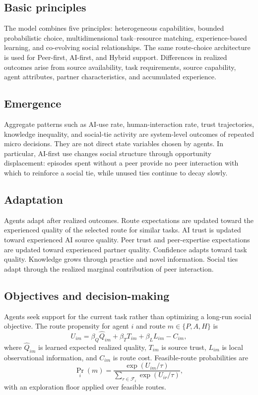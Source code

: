 \documentclass[11pt]{article}
\begin{document}
\subsection{Basic principles}
The model combines five principles: heterogeneous capabilities, bounded probabilistic choice, multidimensional task--resource matching, experience-based learning, and co-evolving social relationships. The same route-choice architecture is used for Peer-first, AI-first, and Hybrid support. Differences in realized outcomes arise from source availability, task requirements, source capability, agent attributes, partner characteristics, and accumulated experience.

\subsection{Emergence}
Aggregate patterns such as AI-use rate, human-interaction rate, trust trajectories, knowledge inequality, and social-tie activity are system-level outcomes of repeated micro decisions. They are not direct state variables chosen by agents. In particular, AI-first use changes social structure through opportunity displacement: episodes spent without a peer provide no peer interaction with which to reinforce a social tie, while unused ties continue to decay slowly.

\subsection{Adaptation}
Agents adapt after realized outcomes. Route expectations are updated toward the experienced quality of the selected route for similar tasks. AI trust is updated toward experienced AI source quality. Peer trust and peer-expertise expectations are updated toward experienced partner quality. Confidence adapts toward task quality. Knowledge grows through practice and novel information. Social ties adapt through the realized marginal contribution of peer interaction.

\subsection{Objectives and decision-making}
Agents seek support for the current task rather than optimizing a long-run social objective. The route propensity for agent $i$ and route $m\in\{P,A,H\}$ is
\begin{equation}
U_{im}=\beta_Q\widehat Q_{im}+\beta_T T_{im}+\beta_L L_{im}-C_{im},
\label{eq:oddutility}
\end{equation}
where $\widehat Q_{im}$ is learned expected realized quality, $T_{im}$ is source trust, $L_{im}$ is local observational information, and $C_{im}$ is route cost. Feasible-route probabilities are
\begin{equation}
\Pr_i(m)=\frac{\exp(U_{im}/\tau)}{\sum_{r\in\mathcal F_i}\exp(U_{ir}/\tau)},
\end{equation}
with an exploration floor applied over feasible routes.
\end{document}
